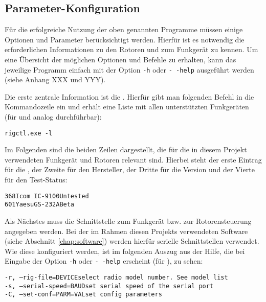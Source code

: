 \subsection{Parameter-Konfiguration}
\label{chap:hamlibconfig}

Für die erfolgreiche Nutzung der oben genannten Programme müssen einige Optionen und Parameter berücksichtigt werden. Hierfür ist es notwendig die erforderlichen Informationen zu den Rotoren und zum Funkgerät zu kennen. Um eine Übersicht der möglichen Optionen und Befehle zu erhalten, kann das jeweilige Programm einfach mit der Option \texttt{-h} oder \texttt{-\,-help} ausgeführt werden (siehe Anhang XXX und YYY).

\clearpage

Die erste zentrale Information ist die . Hierfür gibt man folgenden Befehl in die Kommandozeile ein und erhält eine Liste mit allen unterstützten Funkgeräten (für  und  analog durchführbar):

\vspace{-1em}
\begin{shaded}
	\texttt{rigctl.exe -l}
\end{shaded}
\vspace{-1em}

Im Folgenden sind die beiden Zeilen dargestellt, die für die in diesem Projekt verwendeten Funkgerät und Rotoren relevant sind. Hierbei steht der erste Eintrag für die , der Zweite für den Hersteller, der Dritte für die Version und der Vierte für den Test-Status:

\vspace{-1em}
\begin{shaded}
	\texttt{368\qquad Icom\qquad\ IC-9100\qquad Untested}\\%
	\texttt{601\qquad Yaesu\qquad GS-232A\qquad Beta}
\end{shaded}
\vspace{-1em}
\label{hamlibbackend}

Als Nächstes muss die Schnittstelle zum Funkgerät bzw. zur Rotorensteuerung angegeben werden. Bei der im Rahmen diesen Projekts verwendeten Software (siehe Abschnitt \ref{chap:software}) werden hierfür serielle Schnittstellen verwendet. Wie diese konfiguriert werden, ist im folgenden Auszug aus der Hilfe, die bei Eingabe der Option \texttt{-h} oder \texttt{-\,-help} erscheint (für ), zu sehen:

\vspace{-1em}
\begin{shaded}
	 \texttt{-r, --rig-file=DEVICE\qquad \qquad select radio model number. See model list} \\%
	 \texttt{-s, --serial-speed=BAUD\qquad\quad set serial speed of the serial port} \\%
	 \texttt{-C, --set-conf=PARM=VAL\qquad \quad set config parameters}
\end{shaded}
\vspace{-1em}


